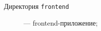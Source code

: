 \documentclass[diploma]{SCWorks}
\begin{document}
\begin{description}

\item[Директория \texttt{frontend}] — frontend-приложение;
\end{description}
\end{document}
